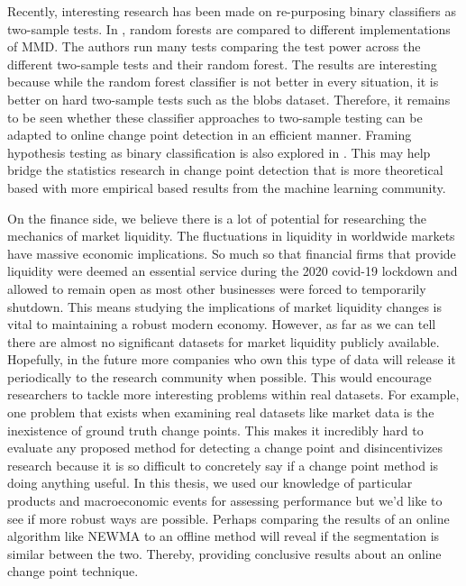 Recently, interesting research has been made on re-purposing binary classifiers as two-sample tests. In \cite{hediger2019use}, random forests are compared to different implementations of MMD. The authors run many tests comparing the test power across the different two-sample tests and their random forest. The results are interesting because while the random forest classifier is not better in every situation, it is better on hard two-sample tests such as the blobs dataset. Therefore, it remains to be seen whether these classifier approaches to two-sample testing can be adapted to online change point detection in an efficient manner. Framing hypothesis testing as binary classification is also explored in \cite{lopezrevisiting}. This may help bridge the statistics research in change point detection that is more theoretical based with more empirical based results from the machine learning community. 

On the finance side, we believe there is a lot of potential for researching the mechanics of market liquidity. The fluctuations in liquidity in worldwide markets have massive economic implications. So much so that financial firms that provide liquidity were deemed an essential service during the 2020 covid-19 lockdown and allowed to remain open as most other businesses were forced to temporarily shutdown. This means studying the implications of market liquidity changes is vital to maintaining a robust modern economy. However, as far as we can tell there are almost no significant datasets for market liquidity publicly available.  Hopefully, in the future more companies who own this type of data will release it periodically to the research community when possible. This would encourage researchers to tackle more interesting problems within real datasets. For example, one problem that exists when examining real datasets like market data is the inexistence of ground truth change points. This makes it incredibly hard to evaluate any proposed method for detecting a change point and disincentivizes research because it is so difficult to concretely say if a change point method is doing anything useful. In this thesis, we used our knowledge of particular products and macroeconomic events for assessing performance but we'd like to see if more robust ways are possible. Perhaps comparing the results of an online algorithm like NEWMA to an offline method will reveal if the segmentation is similar between the two. Thereby, providing conclusive results about an online change point technique.